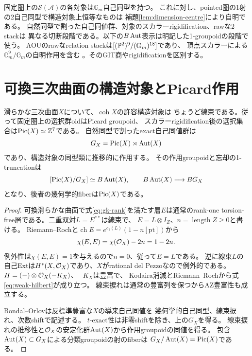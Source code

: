 \begin{remark}[スカラーと慣性]
固定圏上の$\mathscr S(\mathcal A)$の各対象は$\mathbb G_m$自己同型を持つ。
これに対し、pointed圏の1射の2自己同型で構造対象上恒等なものは
補題\ref{lem:dimension-centre}により自明である。
自然同型で割った自己同値群、対象のスカラーrigidification、rawな2-stackは
異なる切断段階である。以下の$B\operatorname{Aut}$表示は明記した1-groupoidの段階で使う。
AOUのrawなrelation stackは$[(\mathbb P^2)^9/(\mathbb G_m)^{18}]$であり、
頂点スカラーによる$\mathbb G_m^9/\mathbb G_m$の自明作用を含む
\cite[\S5.1--5.4]{AOU}。そのGIT商やrigidificationを区別する。
\end{remark}

\section{可換三次曲面の構造対象とPicard作用}
\begin{theorem}[可換基準模型]\label{thm:commutative-structure}
滑らかな三次曲面$X$について、$\operatorname{coh}X$の許容構造対象は
ちょうど線束である。従って固定圏上の選択群oidはPicard groupoid、
スカラーrigidification後の選択集合は$\operatorname{Pic}(X)\simeq\mathbb Z^7$である。
自然同型で割ったexact自己同値群は
\[
 G_X=\operatorname{Pic}(X)\rtimes\operatorname{Aut}(X)
\]
であり、構造対象の同型類に推移的に作用する。
その作用groupoidと忘却の1-truncationは
\[
 [\operatorname{Pic}(X)/G_X]\simeq B\operatorname{Aut}(X),\qquad
 B\operatorname{Aut}(X)\longrightarrow BG_X
\]
となり、後者の幾何学的fiberは$\operatorname{Pic}(X)$である。
\end{theorem}
\begin{proof}
可換滑らかな曲面で式\eqref{eq:gk-rank}を満たす層$E$は通常のrank-one
 torsion-free層である。二重双対$L=E^{**}$は線束で、
$E=L\otimes I_Z$、$n=\operatorname{length}Z\ge0$と書ける。
Riemann--Rochと$\operatorname{ch}E=e^{c_1(L)}(1-n[\mathrm{pt}])$から
\[
 \chi(E,E)=\chi(\mathcal O_X)-2n=1-2n.
\]
例外性は$\chi(E,E)=1$を与えるので$n=0$、従って$E=L$である。
逆に線束$L$の自己Extは$H^*(X,\mathcal O_X)$であり、$X$がrational del Pezzoなので例外的である。
$H=(-)\otimes\mathcal O_X(-K_X)$、$-K_X$は豊富で、
Kodaira消滅とRiemann--Rochから式\eqref{eq:weak-hilbert}が成り立つ。
線束捩れは通常の豊富列を保つからAZ豊富性も成立する。

Bondal--Orlov\cite[Theorem 3.1]{BO}は反標準豊富な$X$の導来自己同値を
幾何学的自己同型、線束捩れ、次数shiftで記述する。
$t$-exact性は非零shiftを除き、上の$G_X$を得る。
線束捩れの推移性と$\mathcal O_X$の安定化群$\operatorname{Aut}(X)$から作用groupoidの同値を得る。
包含$\operatorname{Aut}(X)\subset G_X$による分類groupoidの射のfiberは
$G_X/\operatorname{Aut}(X)=\operatorname{Pic}(X)$である。
\end{proof}


